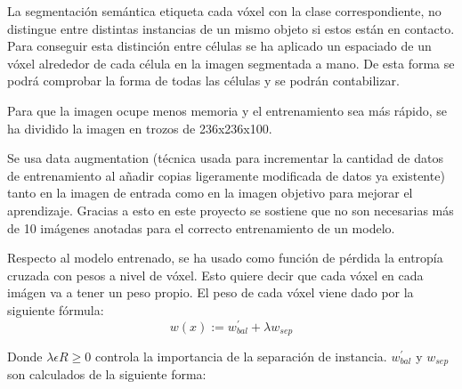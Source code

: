 
La segmentación semántica etiqueta cada vóxel con la clase correspondiente, no distingue entre distintas instancias de un mismo objeto si estos están en contacto. Para conseguir esta distinción entre células se ha aplicado un espaciado de un vóxel alrededor de cada célula en la imagen segmentada a mano. De esta forma se podrá comprobar la forma de todas las células y se podrán contabilizar.

Para que la imagen ocupe menos memoria y el entrenamiento sea más rápido, se ha dividido la imagen en trozos de 236x236x100. 

Se usa data augmentation (técnica usada para incrementar la cantidad de datos de entrenamiento al añadir copias ligeramente modificada de datos ya existente) tanto en la imagen de entrada como en la imagen objetivo para mejorar el aprendizaje. Gracias a esto en este proyecto se sostiene que no son necesarias más de 10 imágenes anotadas para el correcto entrenamiento de un modelo.

Respecto al modelo entrenado, se ha usado como función de pérdida la entropía cruzada con pesos a nivel de vóxel. Esto quiere decir que cada vóxel en cada imágen va a tener un peso propio. El peso de cada vóxel viene dado por la siguiente fórmula:
\begin{equation}
w(x):=w^{'}_{bal}+\lambda w_{sep}
\end{equation}

Donde $\lambda \epsilon R \geq 0$ controla la importancia de la separación de instancia. $w^{'}_{bal}$ y $w_{sep}$
son calculados de la siguiente forma:


